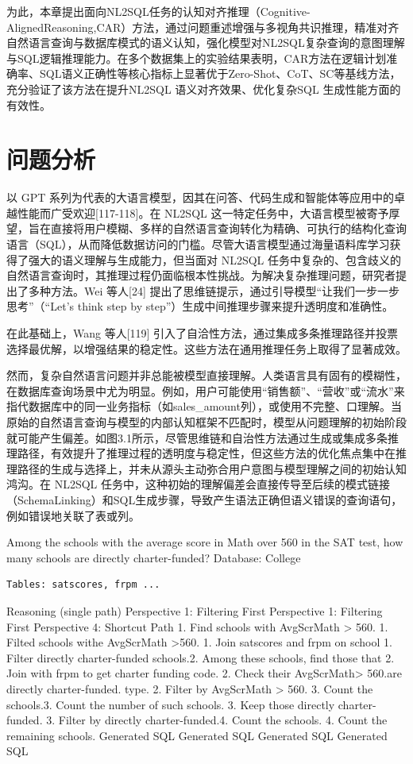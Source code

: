 \documentclass[12pt,a4paper,openright,UTF8]{ctexbook}
\begin{document}
为此，本章提出面向NL2SQL任务的认知对齐推理（Cognitive-AlignedReasoning,CAR）方法，通过问题重述增强与多视角共识推理，精准对齐自然语言查询与数据库模式的语义认知，强化模型对NL2SQL复杂查询的意图理解与SQL逻辑推理能力。在多个数据集上的实验结果表明，CAR方法在逻辑计划准确率、SQL语义正确性等核心指标上显著优于Zero-Shot、CoT、SC等基线方法，充分验证了该方法在提升NL2SQL 语义对齐效果、优化复杂SQL 生成性能方面的有效性。

\section{问题分析}

以 GPT 系列为代表的大语言模型，因其在问答、代码生成和智能体等应用中的卓越性能而广受欢迎[117-118]。在 NL2SQL 这一特定任务中，大语言模型被寄予厚望，旨在直接将用户模糊、多样的自然语言查询转化为精确、可执行的结构化查询语言（SQL），从而降低数据访问的门槛。尽管大语言模型通过海量语料库学习获得了强大的语义理解与生成能力，但当面对 NL2SQL 任务中复杂的、包含歧义的自然语言查询时，其推理过程仍面临根本性挑战。为解决复杂推理问题，研究者提出了多种方法。Wei 等人[24] 提出了思维链提示，通过引导模型“让我们一步一步思考”（“Let’s think step by step”）生成中间推理步骤来提升透明度和准确性。


在此基础上，Wang 等人[119] 引入了自洽性方法，通过集成多条推理路径并投票选择最优解，以增强结果的稳定性。这些方法在通用推理任务上取得了显著成效。


然而，复杂自然语言问题并非总能被模型直接理解。人类语言具有固有的模糊性，在数据库查询场景中尤为明显。例如，用户可能使用“销售额”、“营收”或“流水”来指代数据库中的同一业务指标（如sales\_amount列），或使用不完整、口理解。当原始的自然语言查询与模型的内部认知框架不匹配时，模型从问题理解的初始阶段就可能产生偏差。如图3.1所示，尽管思维链和自治性方法通过生成或集成多条推理路径，有效提升了推理过程的透明度与稳定性，但这些方法的优化焦点集中在推理路径的生成与选择上，并未从源头主动弥合用户意图与模型理解之间的初始认知鸿沟。在 NL2SQL 任务中，这种初始的理解偏差会直接传导至后续的模式链接（SchemaLinking）和SQL生成步骤，导致产生语法正确但语义错误的查询语句，例如错误地关联了表或列。


Among the schools with the average score in Math over 560 in the SAT test, how many schools are directly charter-funded? Database: College

\begin{lstlisting}
Tables: satscores, frpm ...
\end{lstlisting}

Reasoning (single path) Perspective 1: Filtering First Perspective 1: Filtering First Perspective 4: Shortcut Path 1. Find schools with AvgScrMath > 560. 1. Filted schools withe AvgScrMath >560. 1. Join satscores and frpm on school 1. Filter directly charter-funded schools.2. Among these schools, find those that 2. Join with frpm to get charter funding code. 2. Check their AvgScrMath> 560.are directly charter-funded. type. 2. Filter by AvgScrMath > 560. 3. Count the schools.3. Count the number of such schools. 3. Keep those directly charter-funded. 3. Filter by directly charter-funded.4. Count the schools. 4. Count the remaining schools. Generated SQL Generated SQL Generated SQL Generated SQL
\end{document}
